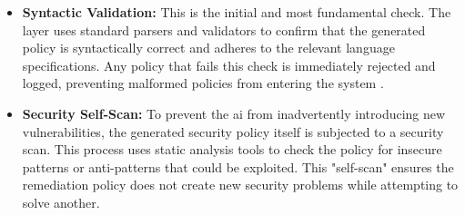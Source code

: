 \begin{itemize}
    \item \textbf{Syntactic Validation:} This is the initial and most fundamental check. The layer uses standard parsers and validators to confirm that the generated policy is syntactically correct and adheres to the relevant language specifications. Any policy that fails this check is immediately rejected and logged, preventing malformed policies from entering the system .
    \item \textbf{Security Self-Scan:} To prevent the \gls{ai} from inadvertently introducing new vulnerabilities, the generated security policy itself is subjected to a security scan. This process uses static analysis tools to check the policy for insecure patterns or anti-patterns that could be exploited. This "self-scan" ensures the remediation policy does not create new security problems while attempting to solve another.
\end{itemize}

